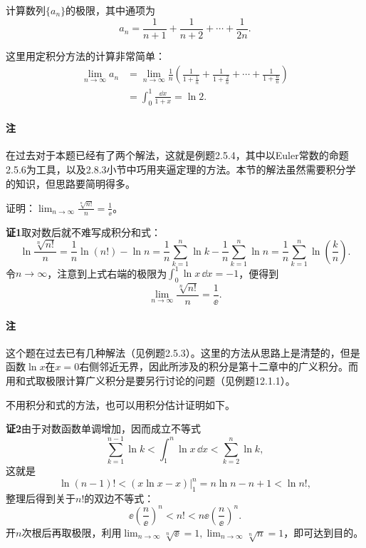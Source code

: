 \begin{xexample}[11.4.1]
计算数列$\{a_n\}$的极限，其中通项为
\[
  a_n=\frac1{n+1}+\frac1{n+2}+\cdots+\frac1{2n}.
\]
\end{xexample}
\begin{xsolution}
这里用定积分方法的计算非常简单：
\begin{align*}
\lim_{n\to\infty}a_n
&=\lim_{n\to\infty}\frac1n\left(
\frac1{1+\frac1n}+\frac1{1+\frac2n}+\cdots+\frac1{1+\frac nn}
\right)\\
&=\int_0^1\frac{\dd x}{1+x}=\ln2.
\end{align*}
\end{xsolution}

\paragraph{注} 在过去对于本题已经有了两个解法，这就是例题2.5.4，其中以Euler常数的命题2.5.6为工具，以及2.8.3小节中巧用夹逼定理的方法。本节的解法虽然需要积分学的知识，但思路要简明得多。

\begin{xexample}[11.4.2]
证明：$\displaystyle\lim_{n\to\infty}\frac{\sqrt[n]{n!}}{n}=\frac1\ee$。
\end{xexample}
\begin{xproof}
\textbf{证1}\quad 取对数后就不难写成积分和式：
\[
  \ln\frac{\sqrt[n]{n!}}{n}
  =\frac1n\ln(n!)-\ln n
  =\frac1n\sum_{k=1}^n\ln k-\frac1n\sum_{k=1}^n\ln n
  =\frac1n\sum_{k=1}^n\ln\left(\frac kn\right).
\]
令$n\to\infty$，注意到上式右端的极限为$\int_0^1\ln x\,\dd x=-1$，便得到
\[
  \lim_{n\to\infty}\frac{\sqrt[n]{n!}}{n}=\frac1\ee.
\]

\paragraph{注} 这个题在过去已有几种解法（见例题2.5.3）。这里的方法从思路上是清楚的，但是函数$\ln x$在$x=0$右侧邻近无界，因此所涉及的积分是第十二章中的广义积分。而用和式取极限计算广义积分是要另行讨论的问题（见例题12.1.1）。

不用积分和式的方法，也可以用积分估计证明如下。

\textbf{证2}\quad 由于对数函数单调增加，因而成立不等式
\[
  \sum_{k=1}^{n-1}\ln k<\int_1^n\ln x\,\dd x<\sum_{k=2}^n\ln k,
\]
这就是
\[
  \ln(n-1)!<(x\ln x-x)\Big|_1^n=n\ln n-n+1<\ln n!,
\]
整理后得到关于$n!$的双边不等式：
\[
  \ee\left(\frac n\ee\right)^n<n!<n\ee\left(\frac n\ee\right)^n.
\]
开$n$次根后再取极限，利用$\lim_{n\to\infty}\sqrt[n]{\ee}=1,\lim_{n\to\infty}\sqrt[n]{n}=1$，即可达到目的。
\end{xproof}

